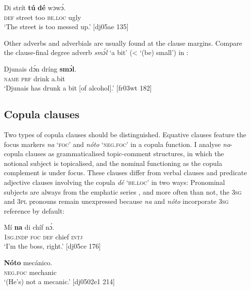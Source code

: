 \ea%
    \label{ex:key:522}
    \gll \textsc{D}i  strít    \textbf{tú}  \textbf{dé}    wɔwɔ́.\\
\textsc{def}  street  too  \textsc{be.loc}  ugly\\

\glt ‘The street is too messed up.’ [dj05ae 135]
\z

Other adverbs and adverbials are usually found at the clause margins. Compare the clause-final degree adverb \textit{smɔ́l} ‘a bit’ (< ‘(be) small’) in :


\ea%
    \label{ex:key:523}
    \gll Djunais  dɔ́n  dríng  \textbf{smɔ́l}.\\
\textsc{name}  \textsc{prf}  drink  a.bit\\

\glt ‘Djunais has drunk a bit [of alcohol].’ [fr03wt 182]
\z

\subsection{Copula clauses}

Two types of copula clauses should be distinguished. Equative clauses feature the focus markers \textit{na} \textsc{‘foc’} and \textit{nóto} \textsc{‘neg.foc’} in a copula function. I analyse \textit{na}{}-copula clauses as grammaticalised topic-comment structures, in which the notional subject is topicalised, and the nominal functioning as the copula complement is under focus. These clauses differ from verbal clauses and predicate adjective clauses involving the copula \textit{dé} ‘\textsc{be.loc}’ in two ways: Pronominal subjects are always from the emphatic series , and more often than not, the \textsc{3sg} and \textsc{3pl} pronouns remain unexpressed  because \textit{na} and \textit{nóto} incorporate \textsc{3sg} reference by default:


\ea%
    \label{ex:key:524}
    \gll Mí    \textbf{na}  di chíf    nɔ́.\\
\textsc{1sg.indp}  \textsc{foc}  \textsc{def}  chief  \textsc{intj}\\

\glt ‘I’m the boss, right.’ [dj05ce 176]
\z


\ea%
    \label{ex:key:525}
    \gll \textbf{Nóto}  mecánico.\\
\textsc{neg}.\textsc{foc}  mechanic\\

\glt ‘(He’s) not a mecanic.’ [dj0502e1 214]
\z

